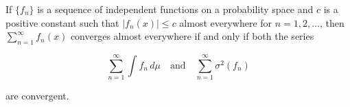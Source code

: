 If $\{f_n\}$ is a sequence of independent functions on a probability space and $c$ is a positive constant such that $|f_n(x)| \leq c$ almost everywhere for $n = 1, 2, \dots$, then $\sum_{n=1}^{\infty} f_n(x)$ converges almost everywhere if and only if both the series

$$\sum_{n=1}^{\infty} \int f_n \, d\mu \quad \text{and} \quad \sum_{n=1}^{\infty} \sigma^2(f_n)$$

are convergent.
